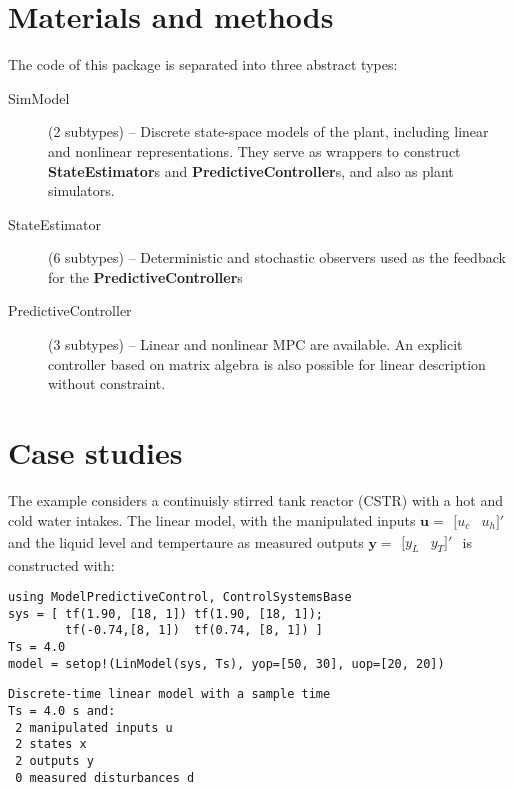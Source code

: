 \section{Materials and methods}

The code of this package is separated into three abstract types:
\begin{description}
    \item[SimModel] (2 subtypes) -- Discrete state-space models of the plant, including linear and nonlinear representations. They serve as wrappers to construct \textbf{StateEstimator}s and \textbf{PredictiveController}s, and also as plant simulators.
    \item[StateEstimator] (6 subtypes) -- Deterministic and stochastic observers used as the feedback for the \textbf{PredictiveController}s
    \item[PredictiveController] (3 subtypes) -- Linear and nonlinear MPC are available. An explicit controller based on matrix algebra is also possible for linear description without constraint.
\end{description}

\section{Case studies}

The example considers a continuisly stirred tank reactor (CSTR) with a hot and cold water intakes. The linear model, with the manipulated inputs $\mathbf{u}=\begin{smallmatrix}[
u_c & u_h]'\end{smallmatrix}$ and the liquid level and tempertaure as measured outputs $\mathbf{y}=\begin{smallmatrix}[y_L & y_T]'\end{smallmatrix}$ is constructed with:

\begin{verbatim}
using ModelPredictiveControl, ControlSystemsBase
sys = [ tf(1.90, [18, 1]) tf(1.90, [18, 1]);
        tf(-0.74,[8, 1])  tf(0.74, [8, 1]) ]
Ts = 4.0
model = setop!(LinModel(sys, Ts), yop=[50, 30], uop=[20, 20])
\end{verbatim}
\vspace{-26pt}
\begin{verbatim}
Discrete-time linear model with a sample time 
Ts = 4.0 s and:
 2 manipulated inputs u
 2 states x
 2 outputs y
 0 measured disturbances d
\end{verbatim}

